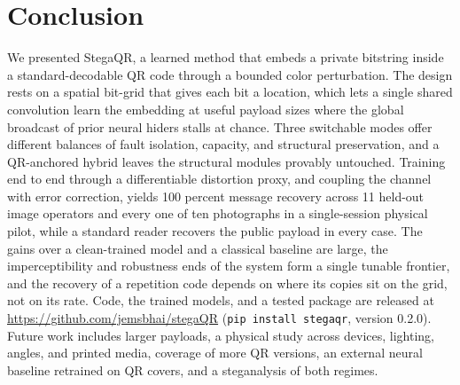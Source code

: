 \documentclass[conference]{IEEEtran}
\begin{document}
\section{Conclusion}
We presented StegaQR, a learned method that embeds a private bitstring inside a
standard-decodable QR code through a bounded color perturbation. The design rests on a
spatial bit-grid that gives each bit a location, which lets a single shared
convolution learn the embedding at useful payload sizes where the global broadcast of prior
neural hiders stalls at chance. Three switchable modes offer different balances of fault
isolation, capacity, and structural preservation, and a QR-anchored hybrid leaves the
structural modules provably untouched. Training end to end through a differentiable
distortion proxy, and coupling the channel with error correction, yields 100 percent
message recovery across 11 held-out image operators and every one of ten photographs in
a single-session physical pilot, while a standard reader recovers the public payload in
every case.
The gains over a clean-trained model and a classical baseline are large, the
imperceptibility and robustness ends of the system form a single tunable frontier, and
the recovery of a repetition code depends on where its copies sit on the grid, not on its
rate. Code, the trained models, and a tested package are released at
\url{https://github.com/jemsbhai/stegaQR} (\texttt{pip install stegaqr}, version 0.2.0).
Future work includes larger payloads, a physical study across devices, lighting, angles,
and printed media, coverage of more QR versions, an external neural baseline retrained on
QR covers, and a steganalysis of both regimes.



\end{document}
